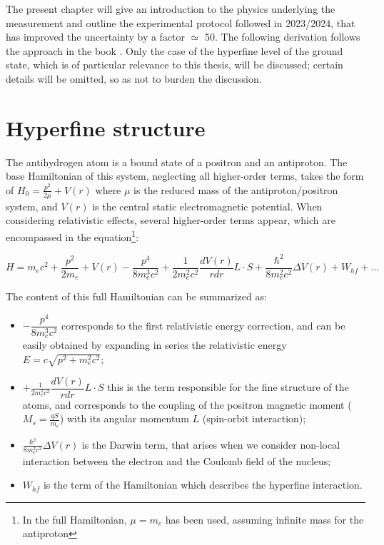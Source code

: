 The present chapter will give an introduction to the physics underlying the measurement and outline the experimental protocol followed in 2023/2024, that has improved the uncertainty by a factor $\simeq$ 50.
The following derivation follows the approach in the book \cite{QuantumMechanics}. Only the case of the hyperfine level of the ground state, which is of particular relevance to this thesis, will be discussed; certain details will be omitted, so as not to burden the discussion.

\section{Hyperfine structure}

The antihydrogen atom is a bound state of a positron and an antiproton. The base Hamiltonian of this system, neglecting all higher-order terms, takes the form of $H_0 = \frac{p^2}{2\mu} + V(r)$ where $\mu$ is the reduced mass of the antiproton/positron system, and $V(r)$ is the central static electromagnetic potential. When considering relativistic effects, several higher-order terms appear, which are encompassed in the equation\footnote{In the full Hamiltonian, $\mu = m_e$ has been used, assuming infinite mass for the antiproton}:

\begin{equation}
H = m_{e} c^2 + \frac{p^2}{2m_e} + V(r) - \dfrac{p^4}{8 m_{e}^3 c^2} + \frac{1}{2m_{e}^2 c^2} \dfrac{dV(r)}{r dr} L \cdot S + \frac{\hbar^2}{8m_{e}^2 c^2} \Delta V(r) + W_{hf} + ...
\end{equation}

The content of this full Hamiltonian can be summarized as:

\begin{itemize}
\item $- \dfrac{p^4}{8 m_{e}^3 c^2}$ corresponds to the first relativistic energy correction, and can be easily obtained by expanding in series the relativistic energy $E = c \sqrt{p^2 + m_{e}^{2} c^2}$;
\item $+ \frac{1}{2m_{e}^2 c^2} \dfrac{dV(r)}{r dr} L \cdot S$ this is the term responsible for the fine structure of the atoms, and corresponds to the coupling of the positron magnetic moment ($M_s = \frac{q S}{m_{e}}$) with its angular momentum $L$ (spin-orbit interaction);
\item  $\frac{\hbar^2}{8m_{e}^2 c^2} \Delta V(r)$ is the Darwin term, that arises when we consider non-local interaction between the electron and the Coulomb field of the nucleus;
\item $W_{hf}$ is the term of the Hamiltonian which describes the hyperfine interaction.
\end{itemize}

